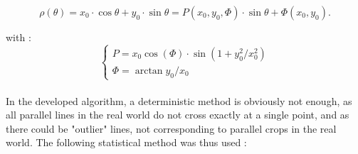 \begin{equation}
\rho(\theta) = x_{0} \cdot \cos{\theta} + y_{0} \cdot \sin{\theta} = P(x_{0}, y_{0},\Phi) \cdot \sin{\theta + \Phi(x_{0}, y_{0})} .
 	\label{eq:my_equation}
\end{equation}

with : 
\begin{equation}
\begin{cases} 
P = x_{0}\cos(\Phi) \cdot \sin(1 + y_{0}^2/x_{0}^2) \\
\Phi = \arctan{y_{0}/x_{0}}
\end{cases}
 	\label{eq:my_equation}
\end{equation} \\

In the developed algorithm, a deterministic method is obviously not enough, as all parallel lines in the real world do not cross exactly at a single point, and as there could be "outlier" lines, not corresponding to parallel crops in the real world. The following statistical method was thus used :  



